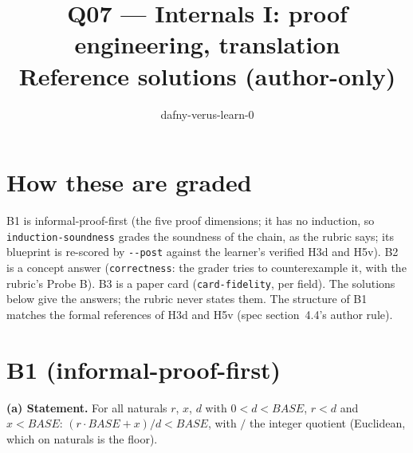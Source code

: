 \documentclass[11pt]{article}
\title{Q07 --- Internals I: proof engineering, translation \\ \large Reference solutions (author-only)}
\author{dafny-verus-learn-0}
\date{}
\begin{document}
\maketitle
\sloppy

\section*{How these are graded}
B1 is informal-proof-first (the five proof dimensions; it has no induction, so
\texttt{induction-soundness} grades the soundness of the chain, as the rubric
says; its blueprint is re-scored by \verb+--post+ against the learner's
verified H3d and H5v). B2 is a concept answer (\texttt{correctness}: the
grader tries to counterexample it, with the rubric's Probe B). B3 is a paper
card (\texttt{card-fidelity}, per field). The solutions below give the
answers; the rubric never states them. The structure of B1 matches the formal
references of H3d and H5v (spec section~4.4's author rule).

\section*{B1 (informal-proof-first)}

\textbf{(a) Statement.} For all naturals $r$, $x$, $d$ with
$0 < d < \mathit{BASE}$, $r < d$ and $x < \mathit{BASE}$:
$(r \cdot \mathit{BASE} + x) / d < \mathit{BASE}$, with $/$ the integer
quotient (Euclidean, which on naturals is the floor).
\end{document}
